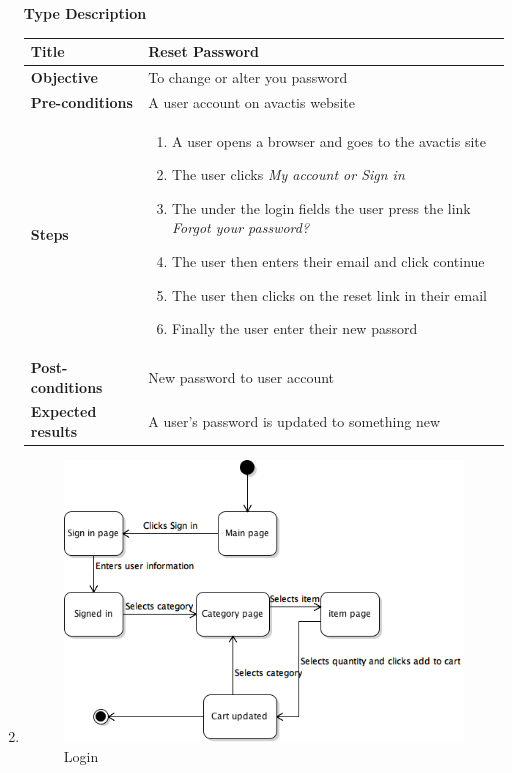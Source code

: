 \documentclass[UKenglish,12pt]{article}
\begin{document}
\begin{enumerate}
\textbf{\hspace{0.3cm}Type\hspace{4.4cm} Description}
\newline \vspace{0.2cm}
\begin{tabular}{| p{5cm} | p{10cm} | }
	\hline
	 \textbf{Title} & Reset Password\\ \hline
	 \textbf{Objective} & To change or alter you password\\ \hline
	 \textbf{Pre-conditions} & A user account on avactis website\\ \hline
	 \textbf{Steps} & \begin{enumerate} \item A user opens a browser and goes to the avactis site \item The user clicks \textit{My account or Sign in} \item The under the login fields the user press the link \textit{Forgot your password?} \item The user then enters their email and click continue \item The user then clicks on the reset link in their email \item Finally the user enter their new passord \end{enumerate} \\ \hline
	 \textbf{Post-conditions} & New password to user account\\ \hline
	 \textbf{Expected results} & A user's password is updated to something new \\ 
	 \hline
\end{tabular} %


\item
\begin{figure}[!h]
\centering
\includegraphics[scale=0.7,keepaspectratio]{Images/SelectProducts.png}
\caption{Login}
\end{figure}


\end{enumerate}
\end{document}
